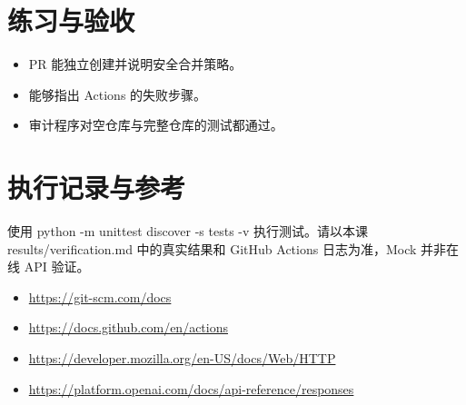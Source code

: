 \documentclass[UTF8,11pt,a4paper]{ctexart}
\begin{document}
\section{练习与验收}
\begin{itemize}
\item PR 能独立创建并说明安全合并策略。
\item 能够指出 Actions 的失败步骤。
\item 审计程序对空仓库与完整仓库的测试都通过。
\end{itemize}
\section{执行记录与参考}
使用 python -m unittest discover -s tests -v 执行测试。请以本课 results/verification.md 中的真实结果和 GitHub Actions 日志为准，Mock 并非在线 API 验证。
\begin{itemize}
\item \url{https://git-scm.com/docs}
\item \url{https://docs.github.com/en/actions}
\item \url{https://developer.mozilla.org/en-US/docs/Web/HTTP}
\item \url{https://platform.openai.com/docs/api-reference/responses}
\end{itemize}
\end{document}
